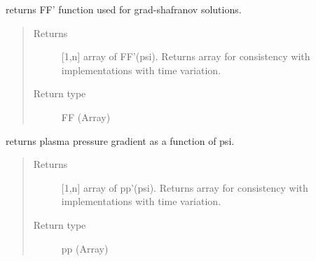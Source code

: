 \documentclass[letterpaper,10pt,english]{sphinxmanual}
\begin{document}
\begin{fulllineitems}
\begin{fulllineitems}
\end{fulllineitems}


\begin{fulllineitems}
\label{\detokenize{eqtools:eqtools.eqdskreader.EqdskReader.getFFPrime}}
returns FF’ function used for grad-shafranov solutions.
\begin{quote}\begin{description}
\item[{Returns}] \leavevmode
{[}1,n{]} array of FF’(psi).  Returns array for
consistency with
{\hyperref[\detokenize{eqtools:eqtools.core.Equilibrium}]{}}
implementations with time variation.

\item[{Return type}] \leavevmode
FF (Array)

\end{description}\end{quote}

\end{fulllineitems}


\begin{fulllineitems}
\label{\detokenize{eqtools:eqtools.eqdskreader.EqdskReader.getPPrime}}
returns plasma pressure gradient as a function of psi.
\begin{quote}\begin{description}
\item[{Returns}] \leavevmode
{[}1,n{]} array of pp’(psi).  Returns array for
consistency with
{\hyperref[\detokenize{eqtools:eqtools.core.Equilibrium}]{}}
implementations with time variation.

\item[{Return type}] \leavevmode
pp (Array)

\end{description}\end{quote}

\end{fulllineitems}


\end{fulllineitems}
\end{document}
